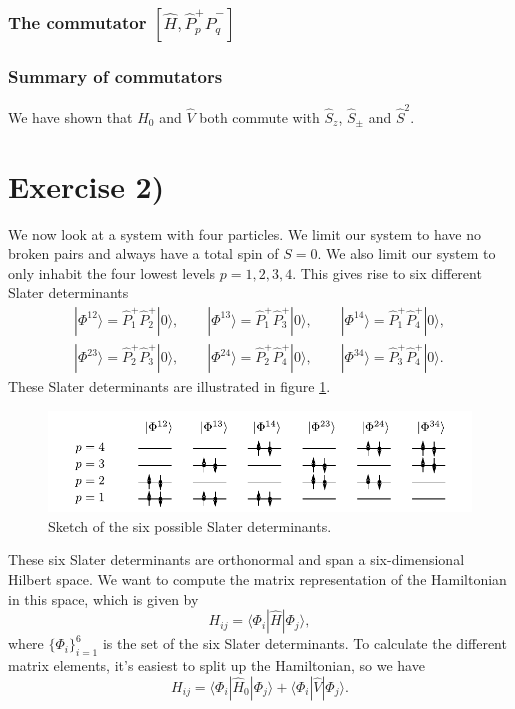 \documentclass[a4paper, 11pt, notitlepage, english]{article}
\newcommand{\ket}[1]{|#1 \rangle}
\newcommand{\op}[1]{\hat{#1}}
\newcommand{\braopket}[3]{\langle #1 | {#2} | #3 \rangle}
\begin{document}
\subsubsection*{The commutator $[\op{H}, \op{P}_p^+\op{P}_q^-]$}

\subsubsection*{Summary of commutators}
We have shown that $\op{H}_0$ and $\op{V}$ both commute with $\op{S}_z$, $\op{S}_\pm$ and $\op{S}^2$.

\clearpage

\section*{Exercise 2)}

We now look at a system with four particles. We limit our system to have no broken pairs and always have a total spin of $S=0$. We also limit our system to only inhabit the four lowest levels $p=1,2,3,4$.  This gives rise to six different Slater determinants
\begin{align*}
	\ket{\Phi^{12}} = \op{P}_1^+ \op{P}_2^+ \ket{0}, \qquad \ket{\Phi^{13}} = \op{P}_1^+ \op{P}_3^+ \ket{0}, \qquad \ket{\Phi^{14}} = \op{P}_1^+ \op{P}_4^+ \ket{0}, \\
	\ket{\Phi^{23}} = \op{P}_2^+ \op{P}_3^+ \ket{0}, \qquad \ket{\Phi^{24}} = \op{P}_2^+ \op{P}_4^+ \ket{0}, \qquad \ket{\Phi^{34}} = \op{P}_3^+ \op{P}_4^+ \ket{0}.
\end{align*}
These Slater determinants are illustrated in figure \ref{fig:2}.

\begin{figure}[htpb]
	\includegraphics[width=\textwidth]{project2b.pdf}
	\caption{Sketch of the six possible Slater determinants. \label{fig:2}}
\end{figure}

These six Slater determinants are orthonormal and span a six-dimensional Hilbert space. We want to compute the matrix representation of the Hamiltonian in this space, which is given by
$$H_{ij} = \braopket{\Phi_i}{\op{H}}{\Phi_j},$$
where $\{\Phi_i\}_{i=1}^6$ is the set of the six Slater determinants. To calculate the different matrix elements, it's easiest to split up the Hamiltonian, so we have
$$H_{ij} = \braopket{\Phi_i}{\op{H}_0}{\Phi_j} + \braopket{\Phi_i}{\op{V}}{\Phi_j}. $$
\end{document}
